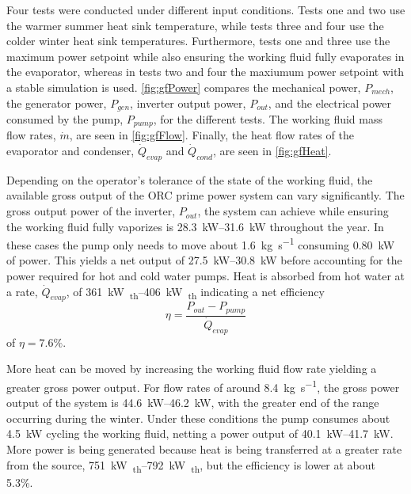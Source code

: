 Four tests were conducted under different input conditions. Tests one and two use the warmer summer heat sink temperature, while tests three and four use the colder winter heat sink temperatures. Furthermore, tests one and three use the maximum power setpoint while also ensuring the working fluid fully evaporates in the evaporator, whereas in tests two and four the maxiumum power setpoint with a stable simulation is used. \autoref{fig:gfPower} compares the mechanical power, $P_{mech}$, the generator power, $P_{gen}$, inverter output power, $P_{out}$, and the electrical power consumed by the pump, $P_{pump}$, for the different tests. The working fluid mass flow rates, $\dot{m}$, are seen in \autoref{fig:gfFlow}. Finally, the heat flow rates of the evaporator and condenser, $\dot{Q}_{evap}$ and $\dot{Q}_{cond}$, are seen in \autoref{fig:gfHeat}.




Depending on the operator's tolerance of the state of the working fluid, the available gross output of the ORC prime power system can vary significantly. The gross output power of the inverter, $P_{out}$, the system can achieve while ensuring the working fluid fully vaporizes is \SIrange{28.3}{31.6}{\kilo\watt} throughout the year. In these cases the pump only needs to move about \SI{1.6}{\kilogram\per\second} consuming \SI{0.80}{\kilo\watt} of power. This yields a net output of \SIrange{27.5}{30.8}{\kilo\watt} before accounting for the power required for hot and cold water pumps. Heat is absorbed from hot water at a rate, $\dot{Q}_{evap}$, of \SIrange{361}{406}{\kilo\watt\textsubscript{th}} indicating a net efficiency 
\begin{equation}
\eta = \frac{P_{out}-P_{pump}}{\dot{Q}_{evap}}
\end{equation}
of $\eta = 7.6\%$.

More heat can be moved by increasing the working fluid flow rate yielding a greater gross power output. For flow rates of around \SI{8.4}{\kilogram\per\second}, the gross power output of the system is \SIrange{44.6}{46.2}{\kilo\watt}, with the greater end of the range occurring during the winter. Under these conditions the pump consumes about \SI{4.5}{\kilo\watt} cycling the working fluid, netting a power output of \SIrange{40.1}{41.7}{\kilo\watt}. More power is being generated because heat is being transferred at a greater rate from the source, \SIrange{751}{792}{\kilo\watt\textsubscript{th}}, but the efficiency is lower at about 5.3\%.

